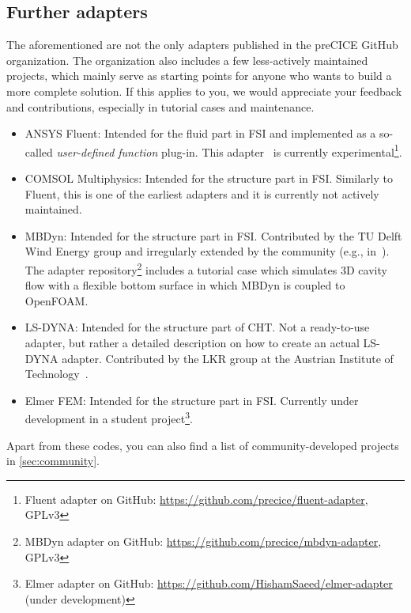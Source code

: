\subsection{Further adapters} 

The aforementioned are not the only adapters published in the preCICE GitHub organization.
The organization also includes a few less-actively maintained projects, which mainly serve as
starting points for anyone who wants to build a more complete solution.
If this applies to you, we would appreciate your feedback and contributions, especially in tutorial
cases and maintenance.

\begin{itemize}
  \item ANSYS Fluent: Intended for the fluid part in FSI
  and implemented as a so-called \textit{user-defined function} plug-in.
  This adapter~\cite{Gatzhammer2015,Hertrich2019} is currently experimental\footnote{Fluent adapter on GitHub: \url{https://github.com/precice/fluent-adapter}, GPLv3}.
  \item COMSOL Multiphysics: Intended for the structure part in FSI. Similarly to Fluent,
  this is one of the earliest adapters and it is currently not actively maintained.
  \item MBDyn: Intended for the structure part in FSI. Contributed by the TU Delft Wind Energy group and irregularly extended by the community (e.g., in~\cite{Cocco2020}).
  The adapter repository\footnote{MBDyn adapter on GitHub: \url{https://github.com/precice/mbdyn-adapter}, GPLv3} includes a tutorial case which simulates 3D cavity flow with a flexible bottom surface in which MBDyn is coupled to OpenFOAM.
  \item LS-DYNA: Intended for the structure part of CHT. Not a ready-to-use adapter, but rather a detailed description on how to create an actual LS-DYNA adapter. Contributed by the LKR group at the Austrian Institute of Technology~\cite{scheiblhofer2019coupling}.
  \item Elmer FEM: Intended for the structure part in FSI. Currently under development in a student project\footnote{Elmer adapter on GitHub: \url{https://github.com/HishamSaeed/elmer-adapter} (under development)}.
\end{itemize}

Apart from these codes, you can also find a list of community-developed projects in \autoref{sec:community}.

